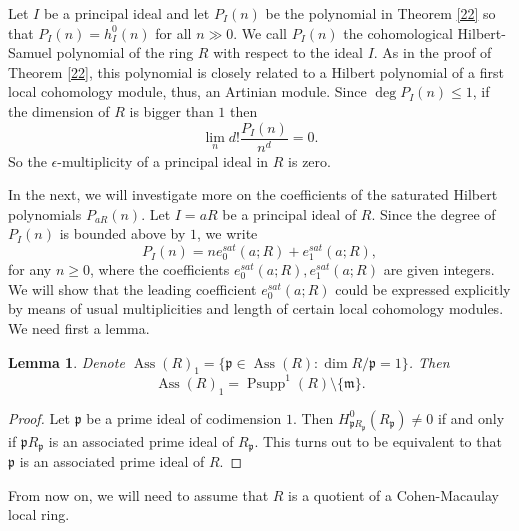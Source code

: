 \documentclass{amsart}
\newtheorem{lemma}[theorem]{Lemma}
\theoremstyle {definition}
\theoremstyle {remark}
\begin{document}
Let $I$ be a principal ideal and let $P_I(n)$ be the polynomial in Theorem \ref{22} so that $P_I(n)=h^0_I(n)$ for all $n\gg 0$. We call $P_I(n)$ the cohomological Hilbert-Samuel polynomial of the ring $R$ with respect to the ideal $I$. As in the proof of Theorem \ref{22}, this polynomial is closely related to a Hilbert polynomial of a first local cohomology module, thus, an Artinian module. Since $\deg P_I(n)\leq 1$, if the dimension of $R$ is bigger than $1$ then
$$\lim_nd!\frac{P_I(n)}{n^d}=0.$$
So the $\epsilon$-multiplicity of a principal ideal in $R$ is zero.

In the next, we will investigate more on the coefficients of the saturated Hilbert polynomials $P_{aR}(n)$. Let $I=aR$ be a principal ideal of $R$. Since the degree of $P_I(n)$ is bounded above by $1$, we write
$$P_I(n)=ne^{sat}_0(a; R)+e_1^{sat}(a; R),$$
for any $n\geq 0$, where the coefficients $e^{sat}_0(a; R), e^{sat}_1(a; R)$ are given integers. We will show that the leading coefficient $e_0^{sat}(a; R)$ could be expressed explicitly by means of usual multiplicities and length of certain local cohomology modules. We need first a lemma.

\begin{lemma}\label{23}
Denote ${\operatorname{Ass}}(R)_1=\{{\ensuremath{\mathfrak p}}\in{\operatorname{Ass}}(R): \dim R/{\ensuremath{\mathfrak p}}=1\}$. Then
$${\operatorname{Ass}}(R)_1={\operatorname{Psupp}}^1(R)\setminus\{{\ensuremath{\mathfrak m}}\}.$$
\end{lemma}
\begin{proof}
Let ${\ensuremath{\mathfrak p}}$ be a prime ideal of codimension $1$. Then $H^0_{{\ensuremath{\mathfrak p}} R_{\ensuremath{\mathfrak p}}}(R_{\ensuremath{\mathfrak p}})\not=0$ if and only if ${\ensuremath{\mathfrak p}} R_{\ensuremath{\mathfrak p}}$ is an associated prime ideal of $R_{\ensuremath{\mathfrak p}}$. This turns out to be equivalent to that ${\ensuremath{\mathfrak p}}$ is an associated prime ideal of $R$.
\end{proof}

From now on, we will need to assume that $R$ is a quotient of a Cohen-Macaulay local ring.
\end{document}
